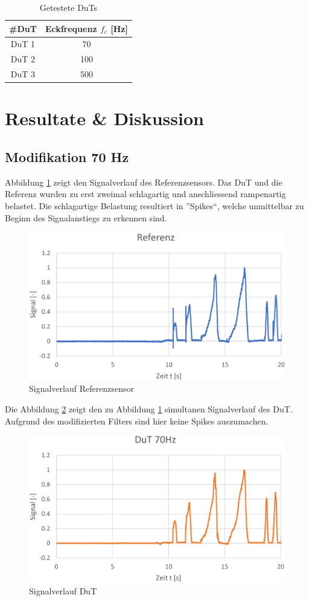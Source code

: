 \documentclass[12pt,a4paper]{article}
\begin{document}
\begin{table}[H]
	\centering
	\caption{Getestete DuTs}
	\begin{tabular}{c|c}
		\textbf{\#DuT} &\textbf{ Eckfrequenz $f_c$ [Hz]}\\
		\hline
		DuT 1 & 70 \\
		DuT 2 & 100\\
		DuT 3 & 500\\
	\end{tabular}	
	\label{tab:params}
\end{table}
	\section{Resultate \& Diskussion}
	\subsection{Modifikation 70 Hz}
Abbildung \ref{fig:refsolo} zeigt den Signalverlauf des Referenzsensors. Das DuT und die Referenz wurden zu erst zweimal schlagartig  und anschliessend rampenartig belastet. Die schlagartige Belastung resultiert in ''Spikes``, welche unmittelbar zu Beginn des Signalanstiegs zu erkennen sind.
	\begin{figure}[H]
		\centering
		\includegraphics[width=1\linewidth]{img_70Hz/ref_solo}
		\caption{Signalverlauf Referenzsensor}
		\label{fig:refsolo}
	\end{figure}
\noindent Die Abbildung \ref{fig:dutsolo} zeigt den zu Abbildung \ref{fig:refsolo} simultanen Signalverlauf des DuT. Aufgrund des modifizierten Filters sind hier keine Spikes auszumachen. 
	\begin{figure}[H]
		\centering
		\includegraphics[width=1\linewidth]{img_70Hz/dut_solo}
		\caption{Signalverlauf DuT}
		\label{fig:dutsolo}
	\end{figure}
\end{document}
